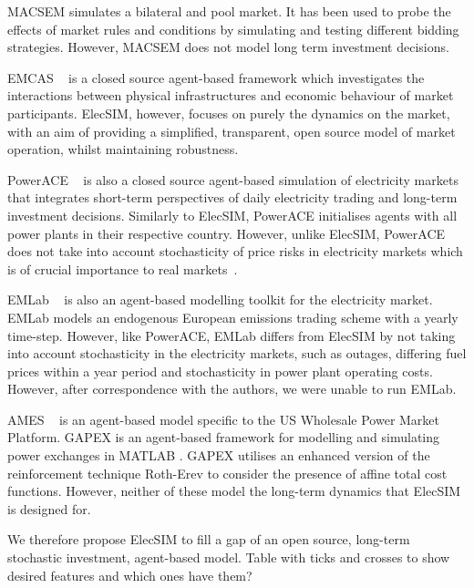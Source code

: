 MACSEM \cite{Praca2003} simulates a bilateral and pool market. It has been used to probe the effects of market rules and conditions by simulating and testing different bidding strategies. However, MACSEM does not model long term investment decisions.

EMCAS ~\cite{Conzelmann} is a closed source agent-based framework which investigates the interactions between physical infrastructures and economic behaviour of market participants. ElecSIM, however, focuses on purely the dynamics on the market, with an aim of providing a simplified, transparent, open source model of market operation, whilst maintaining robustness.

PowerACE ~\cite{Rothengatter2007} is also a closed source agent-based simulation of electricity markets that integrates short-term perspectives of daily electricity trading and long-term investment decisions. Similarly to ElecSIM, PowerACE initialises agents with all power plants in their respective country. However, unlike ElecSIM, PowerACE does not take into account stochasticity of price risks in electricity markets which is of crucial importance to real markets~\cite{Most2010}.

EMLab ~\cite{Chappin2017} is also an agent-based modelling toolkit for the electricity market. EMLab models an endogenous European emissions trading scheme with a yearly time-step. However, like PowerACE, EMLab differs from ElecSIM by not taking into account stochasticity in the electricity markets, such as outages, differing fuel prices within a year period and stochasticity in power plant operating costs. However, after correspondence with the authors, we were unable to run EMLab.

AMES ~\cite{Sun2007} is an agent-based model specific to the US Wholesale Power Market Platform. GAPEX \cite{Cincotti2013} is an agent-based framework for modelling and simulating power exchanges in MATLAB . GAPEX utilises an enhanced version of the reinforcement technique Roth-Erev to consider the presence of affine total cost functions. However, neither of these model the long-term dynamics that ElecSIM is designed for.

We therefore propose ElecSIM to fill a gap of an open source, long-term stochastic investment, agent-based model. {\color{red}Table with ticks and crosses to show desired features and which ones have them?}

